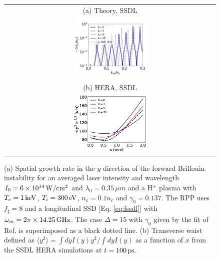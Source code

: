 \documentclass[
 reprint,
 amsmath,amssymb,
 aps,
]{revtex4-1}
\begin{document}
\begin{figure}
\begin{tabular}{c}
(a) Theory, SSDL\\
\includegraphics[width=0.35\textwidth,trim={-0cm 0 0 0},clip]{SSDL_H+1keV300eV_new.png}\\
(b) HERA, SSDL\\
\includegraphics[width=0.35\textwidth]{y2m_ssdl.eps}
\end{tabular}
\caption{ \label{fig:ssdl} 
(a) Spatial growth rate in the $y$ direction of the forward Brillouin instability for an averaged laser intensity and wavelength $I_0=6\times 10^{14}\,\rm W/cm^2$ and  $\lambda_0=0.35\,\mu m$ and a  H$^+$  plasma with $T_e =1\,\rm  keV$, $ T_i=300\,  \rm eV$, $n_{e}=0.1n_c$ and $\gamma_0=0.137$.
The RPP uses $f_\sharp = 8$ and a longitudinal  SSD [Eq. \eqref{eq:fssdl}] with  $\omega_m=2\pi \times14.25\,\rm GHz$.
The case $\Delta=15$ with $\gamma_0$ given by the fit of Ref. \cite[]{casanova_1989} is superimposed as a black dotted line.
(b) Transverse waist defined as $\langle y^2\rangle=\int dyI(y)y^2 /\int dyI(y)$ as a function of $x$  from the SSDL HERA   simulations at $t=100\,\rm ps$.
}
\end{figure}
\end{document}
